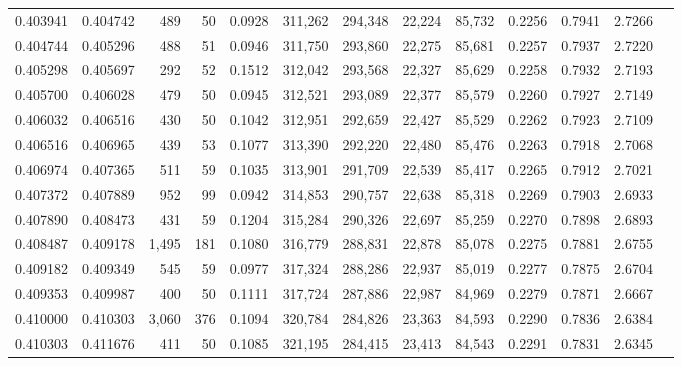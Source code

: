 \begin{tabular}{rrrrrrrrrrrrr}
0.403941 & 0.404742 &   489 &  50 &                                     0.0928 & 311,262 & 294,348 &  22,224 &  85,732 & 0.2256 & 0.7941 & 2.7266 \\
0.404744 & 0.405296 &   488 &  51 &                                     0.0946 & 311,750 & 293,860 &  22,275 &  85,681 & 0.2257 & 0.7937 & 2.7220 \\
0.405298 & 0.405697 &   292 &  52 &                                     0.1512 & 312,042 & 293,568 &  22,327 &  85,629 & 0.2258 & 0.7932 & 2.7193 \\
0.405700 & 0.406028 &   479 &  50 &                                     0.0945 & 312,521 & 293,089 &  22,377 &  85,579 & 0.2260 & 0.7927 & 2.7149 \\
0.406032 & 0.406516 &   430 &  50 &                                     0.1042 & 312,951 & 292,659 &  22,427 &  85,529 & 0.2262 & 0.7923 & 2.7109 \\
0.406516 & 0.406965 &   439 &  53 &                                     0.1077 & 313,390 & 292,220 &  22,480 &  85,476 & 0.2263 & 0.7918 & 2.7068 \\
0.406974 & 0.407365 &   511 &  59 &                                     0.1035 & 313,901 & 291,709 &  22,539 &  85,417 & 0.2265 & 0.7912 & 2.7021 \\
0.407372 & 0.407889 &   952 &  99 &                                     0.0942 & 314,853 & 290,757 &  22,638 &  85,318 & 0.2269 & 0.7903 & 2.6933 \\
0.407890 & 0.408473 &   431 &  59 &                                     0.1204 & 315,284 & 290,326 &  22,697 &  85,259 & 0.2270 & 0.7898 & 2.6893 \\
0.408487 & 0.409178 & 1,495 & 181 &                                     0.1080 & 316,779 & 288,831 &  22,878 &  85,078 & 0.2275 & 0.7881 & 2.6755 \\
0.409182 & 0.409349 &   545 &  59 &                                     0.0977 & 317,324 & 288,286 &  22,937 &  85,019 & 0.2277 & 0.7875 & 2.6704 \\
0.409353 & 0.409987 &   400 &  50 &                                     0.1111 & 317,724 & 287,886 &  22,987 &  84,969 & 0.2279 & 0.7871 & 2.6667 \\
0.410000 & 0.410303 & 3,060 & 376 &                                     0.1094 & 320,784 & 284,826 &  23,363 &  84,593 & 0.2290 & 0.7836 & 2.6384 \\
0.410303 & 0.411676 &   411 &  50 &                                     0.1085 & 321,195 & 284,415 &  23,413 &  84,543 & 0.2291 & 0.7831 & 2.6345 \\

\end{tabular}
